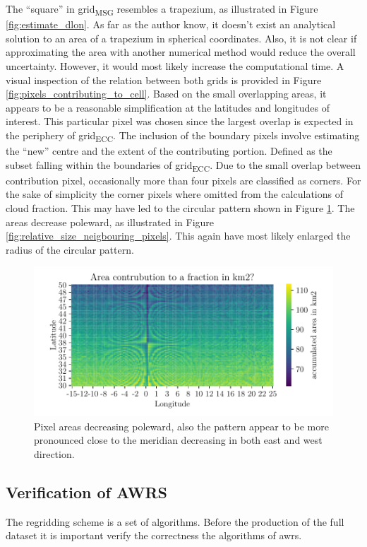 The ``square'' in grid\textsubscript{MSG} resembles a trapezium, as illustrated in Figure \ref{fig:estimate_dlon}. As far as the author know, it doesn't exist an analytical solution to an area of a trapezium in spherical coordinates. Also, it is not clear if approximating the area with another numerical method would reduce the overall uncertainty. However, it would most likely increase the computational time. 
A visual inspection of the relation between both grids is provided in 
Figure \ref{fig:pixels_contributing_to_cell}. Based on the small overlapping areas, it appears to be a reasonable simplification at the latitudes and longitudes of interest. This particular pixel was chosen since the largest overlap is expected in the periphery of grid\textsubscript{ECC}. The inclusion of the boundary pixels involve estimating the ``new'' centre and the extent of the contributing portion. Defined as the subset falling within the boundaries of grid\textsubscript{ECC}. Due to the small overlap between contribution pixel, occasionally more than four pixels are classified as corners. For the sake of simplicity the corner pixels where omitted from the calculations of cloud fraction. This may have led to the circular pattern shown in Figure \ref{fig:area_pixel_signal}. The areas decrease poleward, as illustrated in Figure \ref{fig:relative_size_neigbouring_pixels}. This again have most likely enlarged the radius of the circular pattern.
\begin{figure}[ht]
    \centering
    \includegraphics{python_figs/signal_area_pixel.pdf}
    \caption{Pixel areas decreasing poleward, also the pattern appear to be more pronounced close to the meridian decreasing in both east and west direction.}
    \label{fig:area_pixel_signal}
\end{figure} 

\subsection{Verification of AWRS}
The regridding scheme is a set of algorithms. Before the production of the full dataset it is important verify the correctness the algorithms of \acrshort{awrs}.

